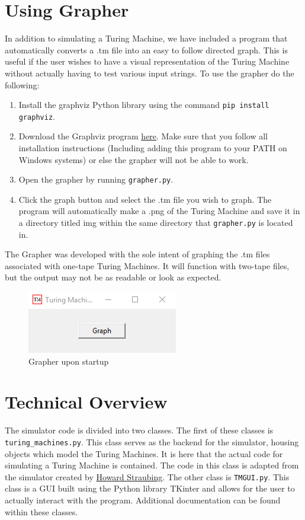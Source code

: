 \documentclass[12pt,letterpaper]{article}
\begin{document}
\section{Using Grapher}
In addition to simulating a Turing Machine, we have included a program that automatically converts a .tm file into an easy to follow directed graph. This is useful if the user wishes to have a visual representation of the Turing Machine without actually having to test various input strings. To use the grapher do the following:
\begin{enumerate}
	\item Install the graphviz Python library using the command \texttt{pip install graphviz}.
	\item Download the Graphviz program \href{https://www.graphviz.org/download/}{here}. Make sure that you follow all installation instructions  (Including adding this program to your PATH on Windows systems) 	or else the grapher will not be able to work.
	\item Open the grapher by running \texttt{grapher.py}.
	\item Click the graph button and select the .tm file you wish to graph. The program will automatically make a .png of the Turing Machine and save it in a directory titled img within the same directory that \texttt{grapher.py} is located in.
\end{enumerate}
The Grapher was developed with the sole intent of graphing the .tm files associated with one-tape Turing Machines. It will function with two-tape files, but the output may not be as readable or look as expected.

\begin{figure}[hbt!]
	\centering\includegraphics[scale=.7]{images/grapher.png}
	\caption{Grapher upon startup}
\end{figure}
	
\section{Technical Overview}
The simulator code is divided into two classes. The first of these classes is \texttt{turing\_machines.py}. This class serves as the backend for the simulator, housing objects which model the Turing Machines. It is here that the actual code for simulating a Turing Machine is contained. The code in this class is adapted from the simulator created by \href{http://www.cs.bc.edu/~straubin/}{Howard Straubing}. The other class is \texttt{TMGUI.py}. This class is a GUI built using the Python library TKinter and allows for the user to actually interact with the program. Additional documentation can be found within these classes.\\
\end{document}
